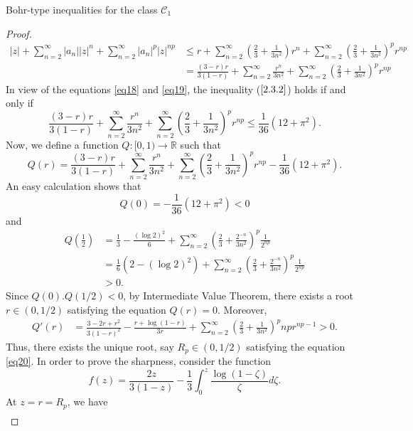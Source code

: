 \documentclass[12pt,a4paper,reqno]{amsart}
\theoremstyle{definition}
\theoremstyle{plain}
\numberwithin{equation}{section}
\begin{document}
\begin{section}{Bohr-type inequalities for the class $\mathcal{C}_1$}
\begin{proof}
\begin{align}
|z|+ \sum_{n=2}^{\infty} |a_n| |z|^n+ \sum_{n=2}^{\infty} |a_n|^{p} |z|^{np}
&\le r+ \sum_{n=2}^{\infty} \left( \frac{2}{3} + \frac{1}{3 n^2} \right)  r^n + \sum_{n=2}^{\infty} \left( \frac{2}{3} + \frac{1}{3 n^2} \right)^p  r^{np}\nonumber\\
&=\frac{(3-r) r}{3 (1-r)}+\sum_{n=2}^{\infty} \frac{r^n}{3 n^2}  + \sum_{n=2}^{\infty} \left( \frac{2}{3} + \frac{1}{3 n^2} \right)^p  r^{np}
\end{align}
In view of the equations \eqref{eq18} and \eqref{eq19}, the inequality ($\ref{2.3.2}$) holds if and only if
\begin{equation*}
\frac{(3-r) r}{3 (1-r)}+\sum_{n=2}^{\infty} \frac{r^n}{3 n^2}  + \sum_{n=2}^{\infty} \left( \frac{2}{3} + \frac{1}{3 n^2} \right)^p  r^{np}\le  \frac{1}{36} \left(12+\pi ^2\right).
\end{equation*}
Now, we define a function $Q:[0, 1)\rightarrow\mathbb{R}$ such that
\begin{equation*}
Q(r)=\frac{(3-r) r}{3 (1-r)}+\sum_{n=2}^{\infty} \frac{r^n}{3 n^2}  + \sum_{n=2}^{\infty} \left( \frac{2}{3} + \frac{1}{3 n^2} \right)^p  r^{np}-\frac{1}{36} \left(12+\pi ^2\right).
\end{equation*}
An easy calculation shows that
\[Q(0)=-\frac{1}{36} \left(12+\pi ^2\right)<0\]
and
\begin{align*}
Q\left(\frac{1}{2}\right)&=\frac{1}{3}-\frac{(\log2)^2}{6}+\sum _{n=2}^{\infty } \left(\frac{2}{3}+\frac{2^{-n}}{3 n^2}\right)^p\frac{1}{2^{n p}}\nonumber\\
&=\frac{1}{6}\left(2-(\log2)^2\right)+\sum _{n=2}^{\infty } \left(\frac{2}{3}+\frac{2^{-n}}{3 n^2}\right)^p\frac{1}{2^{n p}}\nonumber\\
&>0.
\end{align*}
Since $Q(0).Q(1/2)<0$, by Intermediate Value Theorem, there exists a root $r\in(0, 1/2)$ satisfying the equation $Q(r)=0$. Moreover,
\begin{align*}
Q'(r)&=\frac{3-2 r+r^2}{3 (1-r)^2}-\frac{r+\log(1-r)}{3 r}+\sum _{n=2}^{\infty } \left(\frac{2}{3}+\frac{1}{3 n^2}\right)^p {np} r^{{np}-1}>0.
\end{align*}
Thus, there exists the unique root, say $R_{p}\in(0, 1/2)$ satisfying the equation \eqref{eq20}.
In order to prove the sharpness, consider the function
\begin{equation*}
    f(z)= \frac{2z}{3(1-z)} - \frac{1}{3} \int_{0}^{z} \frac{\log(1-\zeta)}{\zeta} d\zeta.
\end{equation*}
At $z=r=R_{p}$, we have
\begin{align*}

\end{align*}
\end{proof}
\end{section}
\end{document}
